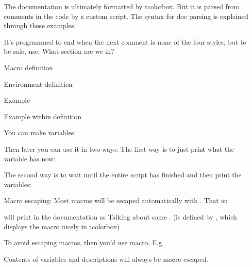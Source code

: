 The documentation is ultimately formatted by tcolorbox. But it is parsed from comments in the code by a custom script.
The syntax for doc parsing is explained through these examples:

It's programmed to end when the next comment is none of the four styles, but to be safe, use:
What section are we in?


Macro definition

Environment definition

Example

Example within definition

You can make variables:

Then later you can use it in two ways:
The first way is to just print what the variable has now:

The second way is to wait until the entire script has finished and then
print the variables:

Macro escaping:
Most macros will be escaped automatically with \dac. That is:

will print in the documentation as Talking about some .
(\dac is defined by \let\dac\DocumentAuxCommand, which displays the macro nicely in tcolorbox)

To avoid escaping macros, then you'd use \!macro. E.g.

Contents of variables and descriptions will always be macro-escaped.
